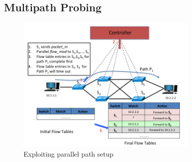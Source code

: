 \subsection{Multipath Probing}
\begin{figure}
\centering
  \centering
  \includegraphics[width=3.5in]{figs/Mazu-mpath.png}
\caption{Exploiting parallel path setup}
\label{fig:mpath}
\end{figure}

